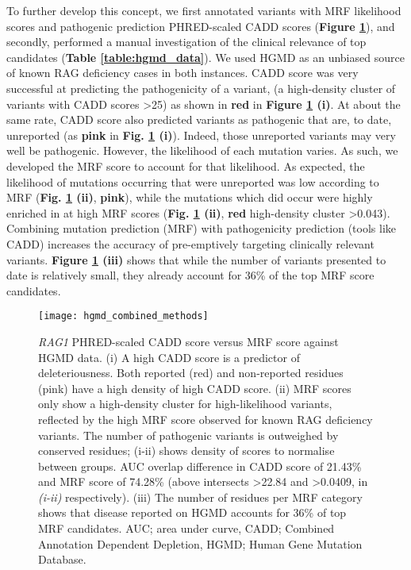 \documentclass[preprint,11pt,fleqn]{elsarticle}
\begin{document}
To further develop this concept, we first annotated variants with  MRF likelihood scores and pathogenic prediction PHRED-scaled CADD scores 
(\textbf{Figure \ref{fig:hgmd_combined_methods}}), 
and secondly, performed a manual investigation of the clinical relevance of top candidates 
(\textbf{Table \ref{table:hgmd_data}}). 
We used HGMD as an unbiased source of known RAG deficiency cases in both instances. 
CADD score was very successful at predicting the pathogenicity of a variant, (a high-density cluster of variants with CADD scores >25) as shown in \textbf{red} in 
\textbf{Figure \ref{fig:hgmd_combined_methods} (i)}. 
At about the same rate, CADD score also predicted variants as pathogenic that are, to date, unreported 
(as \textbf{pink} in \textbf{Fig. \ref{fig:hgmd_combined_methods} (i)}). 
Indeed, those unreported variants may very well be pathogenic. 
However, the likelihood of each mutation varies. 
As such, we developed the MRF score to account for that likelihood. 
As expected, the likelihood of mutations occurring that were unreported was low according to MRF 
(\textbf{Fig.  
\ref{fig:hgmd_combined_methods} (ii)}, \textbf{pink}), 
while the mutations which did occur were highly enriched in at high MRF scores 
(\textbf{Fig.
\ref{fig:hgmd_combined_methods} (ii)}, \textbf{red} high-density cluster >0.043). 
Combining mutation prediction (MRF) with pathogenicity prediction (tools like CADD) increases the accuracy of pre-emptively targeting clinically relevant variants.  
\textbf{Figure \ref{fig:hgmd_combined_methods} (iii)} 
shows that while the number of variants presented to date is relatively small, they already account for 36\% of the top MRF score candidates. 

\begin{figure}[h]
\hspace*{1cm}   %
	\texttt{[image: hgmd\_combined\_methods]}
	\caption{\textit{RAG1} PHRED-scaled CADD score versus MRF score against HGMD data.
	(i) A high CADD score is a predictor of deleteriousness. Both reported (red) and non-reported residues (pink) have a high density of high CADD score. 
	(ii) MRF scores only show a high-density cluster for high-likelihood variants, reflected by the high MRF score observed for known RAG deficiency variants.
	The number of pathogenic variants is outweighed by conserved residues; (i-ii) shows density of scores to normalise between groups.
	AUC overlap difference in CADD score of 21.43\% and MRF score of 74.28\% (above intersects >22.84 and >0.0409, in \textit{(i-ii)} respectively).
	(iii) The number of residues per MRF category shows that disease reported on HGMD accounts for 36\% of top MRF candidates. AUC; area under curve, CADD; Combined Annotation Dependent Depletion, HGMD; Human Gene Mutation Database.}
	\label{fig:hgmd_combined_methods}
\end{figure}
\clearpage
\end{document}
